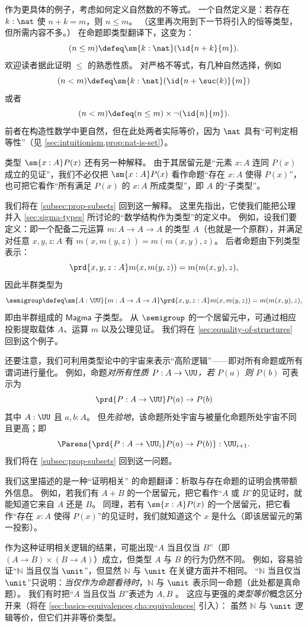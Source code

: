 %
作为更具体的例子，考虑如何定义自然数的不等式。
一个自然定义是：若存在 $k:\nat$ 使 $n+k=m$，则 $n\le m$。
（这里再次用到下一节将引入的恒等类型，但所需内容不多。）
在命题即类型翻译下，这变为：
\[ (n\le m) \defeq \sm{k:\nat} (\id{n+k}{m}). \]
欢迎读者据此证明 $\le$ 的熟悉性质。
对严格不等式，有几种自然选择，例如
\[ (n<m) \defeq \sm{k:\nat} (\id{n+\suc(k)}{m}) \]
或者
\[ (n<m) \defeq (n\le m) \times \neg(\id{n}{m}). \]
前者在构造性数学中更自然，但在此处两者实际等价，因为 $\nat$ 具有“可判定相等性”（见 \cref{sec:intuitionism,prop:nat-is-set}）。
%

类型 $\sm{x:A} P(x)$ 还有另一种解释。
由于其居留元是“元素 $x:A$ 连同 $P(x)$ 成立的见证”，我们不必仅把 $\sm{x:A} P(x)$ 看作命题“存在 $x:A$ 使得 $P(x)$”，也可把它看作“所有满足 $P(x)$ 的 $x:A$ 所成类型”，即 $A$ 的“子类型”。
%

我们将在 \cref{subsec:prop-subsets} 回到这一解释。
这里先指出，它使我们能把公理并入 \cref{sec:sigma-types} 所讨论的“数学结构作为类型”的定义中。
例如，设我们要定义：即一个配备二元运算 $m:A\to A\to A$ 的类型 $A$（也就是一个原群），并满足对任意 $x,y,z:A$ 有 $m(x,m(y,z)) = m(m(x,y),z)$。
后者命题由下列类型表示：
\[\prd{x,y,z:A} m(x,m(y,z)) = m(m(x,y),z),\]
因此半群类型为
\[ \semigroup \defeq \sm{A:\UU}{m:A\to A\to A} \prd{x,y,z:A} m(x,m(y,z)) = m(m(x,y),z), \]
即由半群组成的 $\mathsf{Magma}$ 子类型。
从 $\semigroup$ 的一个居留元中，可通过相应投影提取载体 $A$、运算 $m$ 以及公理见证。
我们将在 \cref{sec:equality-of-structures} 回到这个例子。

还要注意，我们可利用类型论中的宇宙来表示“高阶逻辑”——即对所有命题或所有谓词进行量化。
例如，命题\emph{对所有性质 $P : A \to \UU$，若 $P(a)$ 则 $P(b)$} 可表示为
\[ \prd{P : A \to \UU} P(a) \to P(b) \]
其中 $A : \UU$ 且 $a,b : A$。
但\emph{先验地}，该命题所处宇宙与被量化命题所处宇宙不同且更高；即
\[ \Parens{\prd{P : A \to \UU_i} P(a) \to P(b)} : \UU_{i+1}. \]
我们将在 \cref{subsec:prop-subsets} 回到这一问题。

\mentalpause

我们这里描述的是一种“证明相关”
%
的命题翻译：析取与存在命题的证明会携带额外信息。
例如，若我们有 $A+B$ 的一个居留元，把它看作“$A$ 或 $B$”的见证时，就能知道它来自 $A$ 还是 $B$。
同理，若有 $\sm{x:A} P(x)$ 的一个居留元，把它看作“存在 $x:A$ 使得 $P(x)$”的见证时，我们就知道这个 $x$ 是什么（即该居留元的第一投影）。

作为这种证明相关逻辑的结果，可能出现“$A$ 当且仅当 $B$”（即 $(A\to B)\times (B\to A)$）成立，但类型 $A$ 与 $B$ 的行为仍然不同。
例如，容易验证“$\mathbb{N}$ 当且仅当 $\unit$”，但显然 $\mathbb{N}$ 与 $\unit$ 在关键方面并不相同。
“$\mathbb{N}$ 当且仅当 $\unit$”只说明：\emph{当仅作为命题看待时}，$\mathbb{N}$ 与 $\unit$ 表示同一命题（此处都是真命题）。
我们有时把“$A$ 当且仅当 $B$”表述为 $A,B$ 。
%
%
这应与更强的\emph{类型等价}概念区分开来（将在 \cref{sec:basics-equivalences,cha:equivalences} 引入）：
虽然 $\mathbb{N}$ 与 $\unit$ 逻辑等价，但它们并非等价类型。


